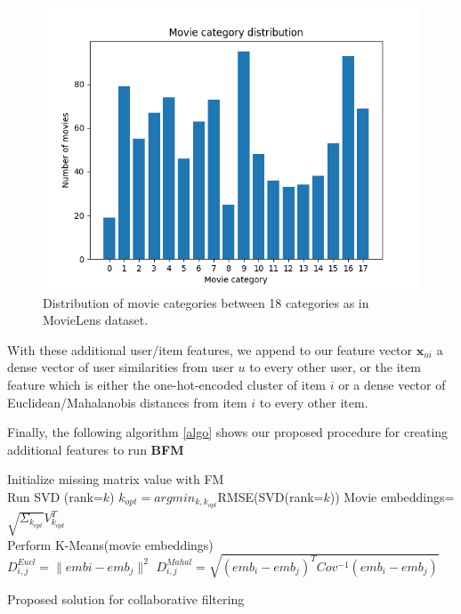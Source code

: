 \documentclass[10pt,conference,compsocconf]{IEEEtran}
\begin{document}
    \begin{figure}
        \label{movie_category_distribution}
        \includegraphics[width=\columnwidth]{figures/movie_category_distribution.png}
        \caption{Distribution of movie categories between 18 categories as in MovieLens dataset.}
    \end{figure}

    With these additional user/item features, we append to our feature vector $\mathbf{x}_{ui}$ a dense vector of user similarities from user $u$ to every other user, or the item feature which is either the one-hot-encoded cluster of item $i$ or a dense vector of Euclidean/Mahalanobis distances from item $i$ to every other item.

    Finally, the following algorithm \ref{algo} shows our proposed procedure for creating additional features to run \textbf{BFM}

    \begin{algorithm}
        \label{algo}
        Initialize missing matrix value with FM\\
         {
            Run SVD (rank=$k$)
            $k_{opt}=argmin_{k, k_{opt}}$RMSE(SVD(rank=$k$))
        }
        Movie embeddings= $\sqrt{\Sigma_{k_{opt}}}V_{k_{opt}}^T$\\
        Perform K-Means(movie embeddings)\\
         {
             {
                $D_{i,j} ^{Eucl} = \|embi - emb_j\|^2$
            }
        }
         {
             {
                $D_{i,j} ^{Mahal} = \sqrt{(emb_i-emb_j)^TCov^{-1}(emb_i-emb_j)}$
            }
        }

        \caption{Proposed solution for collaborative filtering}
    \end{algorithm}
\end{document}
